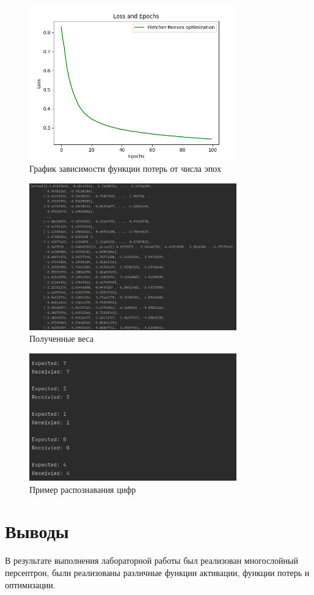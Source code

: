 \documentclass[a4paper, 14pt]{extarticle}
\begin{document}
\begin{figure}[!htb]
	\centering
	\includegraphics[width=0.8\textwidth]{img2}
\caption{График зависимости функции потерь от числа эпох}
\label{fig:img2}
\end{figure}

\begin{figure}[!htb]
	\centering
	\includegraphics[width=0.8\textwidth]{img3}
\caption{Полученные веса}
\label{fig:img3}
\end{figure}

\begin{figure}[!htb]
	\centering
	\includegraphics[width=0.8\textwidth]{img4}
\caption{Пример распознавания цифр}
\label{fig:img4}
\end{figure}

\section{Выводы}\label{Sect::conclusion}

В результате выполнения лабораторной работы был реализован многослойный персептрон, были реализованы различные функции активации, функции потерь и оптимизации.
\end{document}
